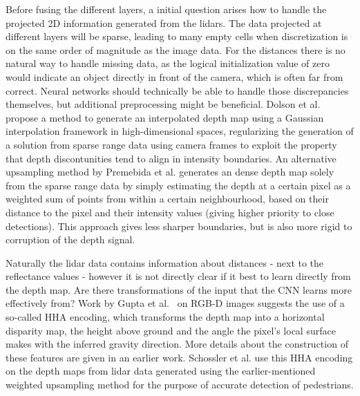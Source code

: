 Before fusing the different layers, a initial question arises how to handle the projected 2D information generated from the lidars. The data projected at different layers will be sparse, leading to many empty cells when discretization is on the same order of magnitude as the image data. For the distances there is no natural way to handle missing data, as the logical initialization value of zero would indicate an object directly in front of the camera, which is often far from correct. Neural networks should technically be able to handle those discrepancies themselves, but additional preprocessing might be beneficial. Dolson et al.~\cite{dolson2010} propose a method to generate an interpolated depth map using a Gaussian interpolation framework in high-dimensional spaces, regularizing the generation of a solution from sparse range data using camera frames to exploit the property that depth discontunities tend to align in intensity boundaries. An alternative upsampling method by Premebida et al.\cite{premebida2014} generates an dense depth map solely from the sparse range data by simply estimating the depth at a certain pixel as a weighted sum of points from within a certain neighbourhood, based on their distance to the pixel and their intensity values (giving higher priority to close detections). This approach gives less sharper boundaries, but is also more rigid to corruption of the depth signal.  

Naturally the lidar data contains information about distances - next to the reflectance values - however it is not directly clear if it best to learn directly from the depth map. Are there transformations of the input that the CNN learns more effectively from? Work by Gupta et al.~\cite{gupta2014} on RGB-D images suggests the use of a so-called HHA encoding, which transforms the depth map into a horizontal disparity map, the height above ground and the angle the pixel's local surface makes with the inferred gravity direction. More details about the construction of these features are given in an earlier work\cite{gupta2013}. Schossler et al.\cite{schlosser2016} use this HHA encoding on the depth maps from lidar data generated using the earlier-mentioned weighted upsampling method\cite{premebida2014} for the purpose of accurate detection of pedestrians.
